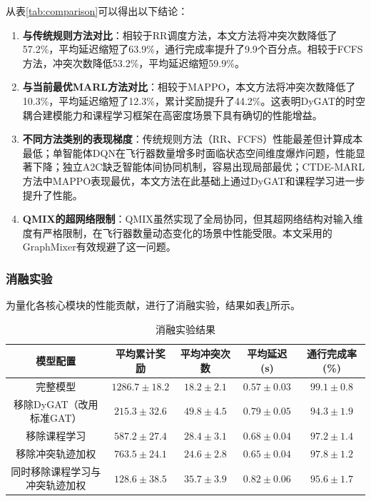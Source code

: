 \documentclass[12pt,a4paper,UTF8]{ctexart}
\begin{document}
从表\ref{tab:comparison}可以得出以下结论：
\begin{enumerate}[label=(\arabic*)]
    \item \textbf{与传统规则方法对比}：相较于RR调度方法，本文方法将冲突次数降低了57.2\%，平均延迟缩短了63.9\%，通行完成率提升了9.9个百分点。相较于FCFS方法，冲突次数降低53.2\%，平均延迟缩短59.9\%。
    \item \textbf{与当前最优MARL方法对比}：相较于MAPPO，本文方法将冲突次数降低了10.3\%，平均延迟缩短了12.3\%，累计奖励提升了44.2\%。这表明DyGAT的时空耦合建模能力和课程学习框架在高密度场景下具有确切的性能增益。
    \item \textbf{不同方法类别的表现梯度}：传统规则方法（RR、FCFS）性能最差但计算成本最低；单智能体DQN在飞行器数量增多时面临状态空间维度爆炸问题，性能显著下降；独立A2C缺乏智能体间协同机制，容易出现局部最优；CTDE-MARL方法中MAPPO表现最优，本文方法在此基础上通过DyGAT和课程学习进一步提升了性能。
    \item \textbf{QMIX的超网络限制}：QMIX虽然实现了全局协同，但其超网络结构对输入维度有严格限制，在飞行器数量动态变化的场景中性能受限。本文采用的GraphMixer有效规避了这一问题。
\end{enumerate}

\subsubsection{消融实验}
为量化各核心模块的性能贡献，进行了消融实验，结果如表\ref{tab:ablation}所示。

\begin{table}[H]
    \centering
    \caption{消融实验结果}
    \label{tab:ablation}
    \begin{tabular}{|c|c|c|c|c|}
        \hline
        模型配置 & 平均累计奖励 & 平均冲突次数 & 平均延迟 (s) & 通行完成率 (\%) \\
        \hline
        完整模型 & $1286.7 \pm 18.2$ & $18.2 \pm 2.1$ & $0.57 \pm 0.03$ & $99.1 \pm 0.8$ \\
        移除DyGAT（改用标准GAT） & $215.3 \pm 32.6$ & $49.8 \pm 4.5$ & $0.79 \pm 0.05$ & $94.3 \pm 1.9$ \\
        移除课程学习 & $587.2 \pm 27.4$ & $28.4 \pm 3.1$ & $0.68 \pm 0.04$ & $97.2 \pm 1.4$ \\
        移除冲突轨迹加权 & $763.5 \pm 24.1$ & $24.6 \pm 2.8$ & $0.65 \pm 0.04$ & $97.8 \pm 1.2$ \\
        同时移除课程学习与冲突轨迹加权 & $128.6 \pm 38.5$ & $35.7 \pm 3.9$ & $0.82 \pm 0.06$ & $95.6 \pm 1.7$ \\
        \hline
    \end{tabular}
\end{table}
\end{document}

